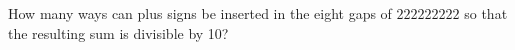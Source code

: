 How many ways can plus signs be inserted in the eight gaps of $222222222$ so that the resulting sum is divisible by 10?
